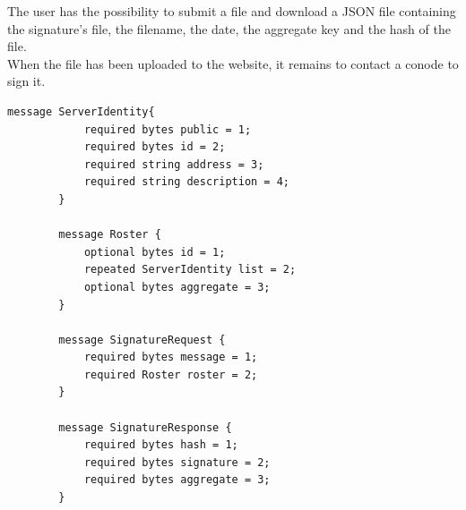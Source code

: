\documentclass[11pt, a4paper, twoside, openright]{book} %
\begin{document}
The user has the possibility to submit a file and download a JSON file containing
the signature's file, the filename, the date, the aggregate key and the hash of the file.\\
When the file has been uploaded to the website, it remains to contact a conode to sign it.\\
\begin{lstlisting}[caption={.proto file}, captionpos=b]
  message ServerIdentity{
            required bytes public = 1;
            required bytes id = 2;
            required string address = 3;
            required string description = 4;
        }

        message Roster {
            optional bytes id = 1;
            repeated ServerIdentity list = 2;
            optional bytes aggregate = 3;
        }

        message SignatureRequest {
            required bytes message = 1;
            required Roster roster = 2;
        }

        message SignatureResponse {
            required bytes hash = 1;
            required bytes signature = 2;
            required bytes aggregate = 3;
        }
\end{lstlisting}
\leavevmode \\





\begingroup
\let\cleardoublepage\clearpage
{}

\endgroup
\end{document}
